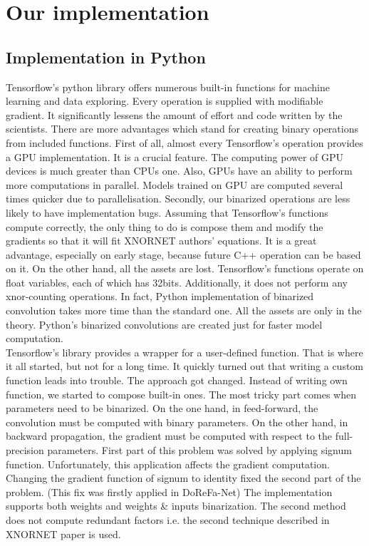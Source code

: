 \documentclass[licencjacka]{pracamgr}
\begin{document}
	\section{Our implementation}

		\subsection{Implementation in Python}
Tensorflow’s python library offers numerous built-in functions for machine learning and data exploring. Every operation is supplied with modifiable gradient. It significantly lessens the amount of effort and code written by the scientists. There are more advantages which stand for creating binary operations from included functions. First of all, almost every Tensorflow’s operation provides a GPU implementation. It is a crucial feature. The computing power of GPU devices is much greater than CPUs one. Also, GPUs have an ability to perform more computations in parallel. Models trained on GPU are computed several times quicker due to parallelisation. Secondly, our binarized operations are less likely to have implementation bugs. Assuming that Tensorflow’s functions compute correctly, the only thing to do is compose them and modify the gradients so that it will fit XNORNET authors’ equations. It is a great advantage, especially on early stage, because future C++ operation can be based on it. On the other hand, all the assets are lost. Tensorflow’s functions operate on float variables, each of which has 32bits. Additionally, it does not perform any xnor-counting operations. In fact, Python implementation of binarized convolution takes more time than the standard one. All the assets are only in the theory. Python’s binarized convolutions are created just for faster model computation. \\
		 
Tensorflow’s library provides a wrapper for a user-defined function. That is where it all started, but not for a long time. It quickly turned out that writing a custom function leads into trouble. The approach got changed. Instead of writing own function, we started to compose built-in ones. The most tricky part comes when parameters need to be binarized. On the one hand, in feed-forward, the convolution must be computed with binary parameters. On the other hand, in backward propagation, the gradient must be computed with respect to the full-precision parameters. First part of this problem was solved by applying signum function. Unfortunately, this application affects the gradient computation. Changing the gradient function of signum to identity fixed the second part of the problem. (This fix was firstly applied in DoReFa-Net) The implementation supports both weights and weights \& inputs binarization. The second method does not compute redundant factors i.e. the second technique described in XNORNET paper is used.
\end{document}
